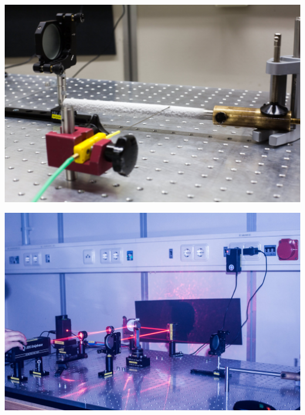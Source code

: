\documentclass[11pt]{beamer}
\begin{document}
\begin{frame}
	\includegraphics[width=\textwidth]{images/2/interferrometer-2}
\end{frame}

\begin{frame}
	\includegraphics[width=\textwidth]{images/2/interferrometer-6}
\end{frame}
\end{document}
